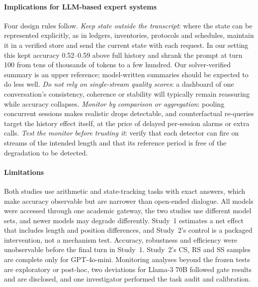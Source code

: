 \paragraph{Implications for LLM-based expert systems}
Four design rules follow. \emph{Keep state outside the transcript}: where the
state can be represented explicitly, as in ledgers, inventories, protocols and
schedules, maintain it in a verified store and send the current state with each
request. In our setting this kept accuracy 0.52--0.59 above full history and
shrank the prompt at turn 100 from tens of thousands of tokens to a few
hundred. Our solver-verified summary is an upper reference; model-written
summaries should be expected to do less well. \emph{Do not rely on
single-stream quality scores}: a dashboard of one conversation's consistency,
coherence or stability will typically remain reassuring while accuracy
collapses. \emph{Monitor by comparison or aggregation}: pooling concurrent
sessions makes realistic drops detectable, and counterfactual re-queries target
the history effect itself, at the price of delayed per-session alarms or extra
calls. \emph{Test the monitor before trusting it}: verify that each detector
can fire on streams of the intended length and that its reference period is
free of the degradation to be detected.

\paragraph{Limitations}
Both studies use arithmetic and state-tracking tasks with exact answers, which
make accuracy observable but are narrower than open-ended dialogue. All models
were accessed through one academic gateway, the two studies use different
model sets, and newer models may degrade differently. Study~1 estimates a net
effect that includes length and position differences, and Study~2's control is
a packaged intervention, not a mechanism test. Accuracy, robustness and
efficiency were unobservable before the final turn in Study~1. Study~2's CS, RS
and SS samples are complete only for GPT-4o-mini. Monitoring analyses beyond
the frozen tests are exploratory or post-hoc, two deviations for Llama-3 70B
followed gate results and are disclosed, and one investigator performed the
task audit and calibration.
